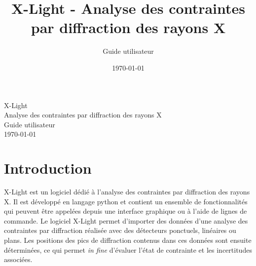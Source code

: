 \documentclass[french,a4paper]{report}
\title{X-Light - Analyse des contraintes par diffraction des rayons X}
\author{Guide utilisateur}
\date{\today}
\begin{document}
\sloppy
 

\begin{titlepage}
\centering
\vfill
{\Huge
X-Light\\
Analyse des contraintes par diffraction des rayons X\\
\Large
\vskip1cm
Guide utilisateur\\
\vskip1cm
\today\\
}    
\vfill
{}
\vfill
\vfill
\end{titlepage}

\tableofcontents 


\chapter{Introduction}
    
X-Light est un logiciel dédié à l'analyse des contraintes par diffraction des rayons X. Il est développé en langage python et contient un ensemble de fonctionnalités qui peuvent être appelées depuis une interface graphique ou à l'aide de lignes de commande. Le logiciel X-Light permet d'importer des données d'une analyse des contraintes par diffraction réalisée avec des détecteurs ponctuels, linéaires ou plans. Les positions des pics de diffraction contenus dans ces données sont ensuite déterminées, ce qui permet \textit{in fine} d'évaluer l'état de contrainte et les incertitudes associées.
\end{document}
